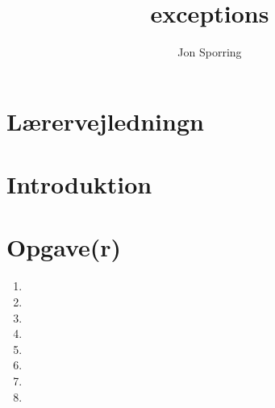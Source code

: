\documentclass[a4paper,12pt]{article}
\title{exceptions}
\author{Jon Sporring}
\begin{document}
\maketitle

\section{Lærervejledningn}

\section{Introduktion}

\section{Opgave(r)}
\begin{enumerate}
\item 
\item 
\item 
\item 
\item 
\item 
\item 
\item 
\end{enumerate}
\end{document}

